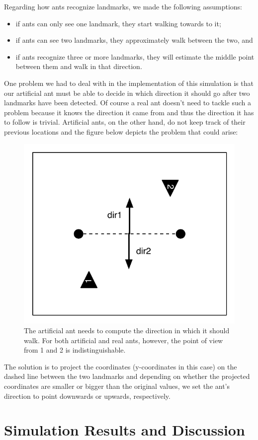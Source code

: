 \documentclass[11pt]{article}
\begin{document}
Regarding how ants recognize landmarks, we made the following assumptions:
\begin{itemize}
\item if ants can only see one landmark, they start walking towards to it;
\item if ants can see two landmarks, they approximately walk between the two, and
\item if ants recognize three or more landmarks, they will estimate the middle point between them and walk in that direction.
\end{itemize}

One problem we had to deal with in the implementation of this simulation is that our artificial ant must be able to decide in which direction it should go after two landmarks have been detected. Of course a real ant doesn't need to tackle such a problem because it knows the direction it came from and thus the direction it has to follow is trivial. Artificial ants, on the other hand, do not keep track of their previous locations and the figure below depicts the problem that could arise:

\begin{figure}[h!]
  \centering
    \includegraphics[width=.6\textwidth]{images/ambiguous_direction}
     \caption{The artificial ant needs to compute the direction in which it should walk. For both artificial and real ants, however, the point of view from 1 and 2 is indistinguishable.}
\end{figure}

The solution is to project the coordinates (y-coordinates in this case) on the dashed line between the two landmarks and depending on whether the projected coordinates are smaller or bigger than the original values, we set the ant's direction to point downwards or upwards, respectively.
\newpage
\section{Simulation Results and Discussion}
\end{document}
